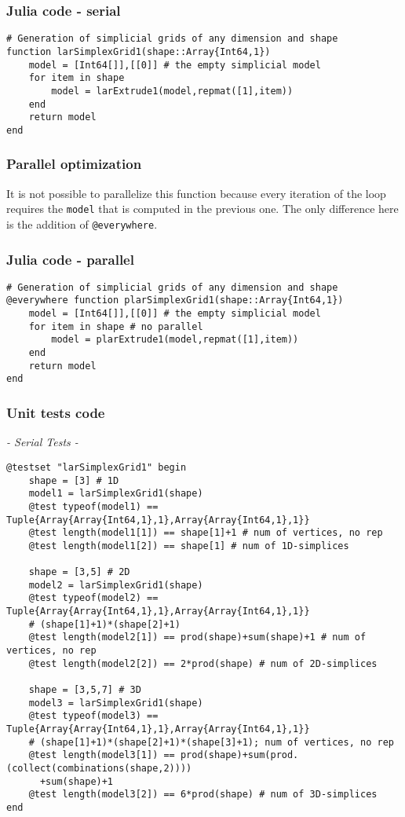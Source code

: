 \documentclass[a4paper,12pt,titlepage]{article}					%
\begin{document}
\subsubsection{Julia code - serial}
\begin{Verbatim}
# Generation of simplicial grids of any dimension and shape
function larSimplexGrid1(shape::Array{Int64,1})
	model = [Int64[]],[[0]] # the empty simplicial model
	for item in shape
		model = larExtrude1(model,repmat([1],item))
	end
	return model
end
\end{Verbatim}

\subsubsection{Parallel optimization}
It is not possible to parallelize this function because every iteration of the loop requires the \texttt{model} that is computed in the previous one.
The only difference here is the addition of \texttt{@everywhere}.

\subsubsection{Julia code - parallel}
\begin{Verbatim}
# Generation of simplicial grids of any dimension and shape
@everywhere function plarSimplexGrid1(shape::Array{Int64,1})
	model = [Int64[]],[[0]] # the empty simplicial model
	for item in shape # no parallel
		model = plarExtrude1(model,repmat([1],item))
	end
	return model
end
\end{Verbatim}

\subsubsection{Unit tests code}
\emph{- Serial Tests -}

\begin{Verbatim}
@testset "larSimplexGrid1" begin
	shape = [3] # 1D
	model1 = larSimplexGrid1(shape)
	@test typeof(model1) == Tuple{Array{Array{Int64,1},1},Array{Array{Int64,1},1}}
	@test length(model1[1]) == shape[1]+1 # num of vertices, no rep
	@test length(model1[2]) == shape[1] # num of 1D-simplices
	
	shape = [3,5] # 2D
	model2 = larSimplexGrid1(shape)
	@test typeof(model2) == Tuple{Array{Array{Int64,1},1},Array{Array{Int64,1},1}}
	# (shape[1]+1)*(shape[2]+1)
	@test length(model2[1]) == prod(shape)+sum(shape)+1 # num of vertices, no rep
	@test length(model2[2]) == 2*prod(shape) # num of 2D-simplices
	
	shape = [3,5,7] # 3D
	model3 = larSimplexGrid1(shape)
	@test typeof(model3) == Tuple{Array{Array{Int64,1},1},Array{Array{Int64,1},1}}
	# (shape[1]+1)*(shape[2]+1)*(shape[3]+1); num of vertices, no rep
	@test length(model3[1]) == prod(shape)+sum(prod.(collect(combinations(shape,2))))
	  +sum(shape)+1
	@test length(model3[2]) == 6*prod(shape) # num of 3D-simplices
end
\end{Verbatim}
\end{document}
